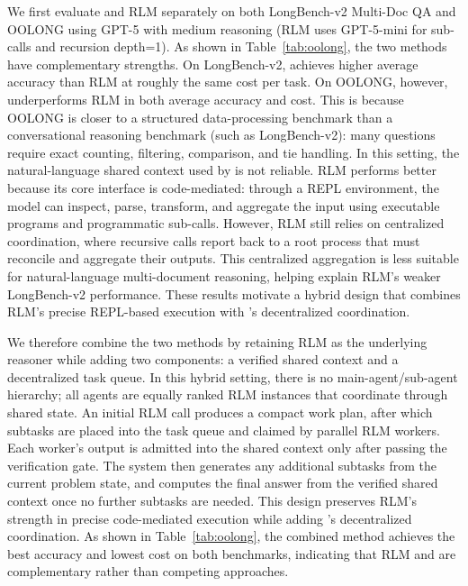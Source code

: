 We first evaluate \toolName{} and RLM separately on both LongBench-v2 Multi-Doc QA and OOLONG using GPT-5 with medium reasoning (RLM uses GPT-5-mini for sub-calls and recursion depth=1). As shown in Table~\ref{tab:oolong}, the two methods have complementary strengths. On LongBench-v2, \toolName{} achieves higher average accuracy than RLM at roughly the same cost per task. On OOLONG, however, \toolName{} underperforms RLM in both average accuracy and cost. This is because OOLONG is closer to a structured data-processing benchmark than a conversational reasoning benchmark (such as LongBench-v2): many questions require exact counting, filtering, comparison, and tie handling. In this setting, the natural-language shared context used by \toolName{} is not reliable. RLM performs better because its core interface is code-mediated: through a REPL environment, the model can inspect, parse, transform, and aggregate the input using executable programs and programmatic sub-calls. However, RLM still relies on centralized coordination, where recursive calls report back to a root process that must reconcile and aggregate their outputs. This centralized aggregation is less suitable for natural-language multi-document reasoning, helping explain RLM's weaker LongBench-v2 performance. These results motivate a hybrid design that combines RLM's precise REPL-based execution with \toolName{}'s decentralized coordination.

We therefore combine the two methods by retaining RLM as the underlying reasoner while adding two \toolName{} components: a verified shared context and a decentralized task queue. In this hybrid setting, there is no main-agent/sub-agent hierarchy; all agents are equally ranked RLM instances that coordinate through shared state. An initial RLM call produces a compact work plan, after which subtasks are placed into the task queue and claimed by parallel RLM workers. Each worker's output is admitted into the shared context only after passing the verification gate. The system then generates any additional subtasks from the current problem state, and computes the final answer from the verified shared context once no further subtasks are needed. This design preserves RLM's strength in precise code-mediated execution while adding \toolName{}'s decentralized coordination. As shown in Table~\ref{tab:oolong}, the combined method achieves the best accuracy and lowest cost on both benchmarks, indicating that RLM and \toolName{} are complementary rather than competing approaches.